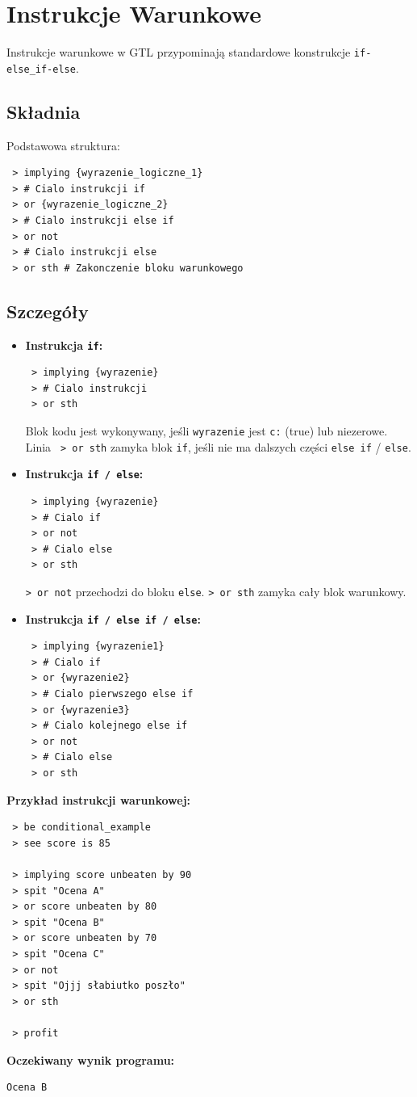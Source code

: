 \documentclass[12pt,a4paper]{article}
\begin{document}
\newpage
\section{Instrukcje Warunkowe}
\label{sec:conditionals}
Instrukcje warunkowe w GTL przypominają standardowe konstrukcje \texttt{if-else\_if-else}.

\subsection{Składnia}
Podstawowa struktura:
\begin{lstlisting}
 > implying {wyrazenie_logiczne_1}
 > # Cialo instrukcji if
 > or {wyrazenie_logiczne_2}
 > # Cialo instrukcji else if
 > or not
 > # Cialo instrukcji else
 > or sth # Zakonczenie bloku warunkowego
\end{lstlisting}

\subsection{Szczegóły}
\begin{itemize}
    \item \textbf{Instrukcja \texttt{if}:}
    \begin{lstlisting}
 > implying {wyrazenie}
 > # Cialo instrukcji
 > or sth
    \end{lstlisting}
    Blok kodu jest wykonywany, jeśli \texttt{{wyrazenie}} jest \texttt{c:} (true) lub niezerowe. Linia \texttt{ > or sth} zamyka blok \texttt{if}, jeśli nie ma dalszych części \texttt{else if} / \texttt{else}.

    \item \textbf{Instrukcja \texttt{if / else}:}
    \begin{lstlisting}
 > implying {wyrazenie}
 > # Cialo if
 > or not
 > # Cialo else
 > or sth
    \end{lstlisting}
    \texttt{> or not} przechodzi do bloku \texttt{else}. \texttt{> or sth} zamyka cały blok warunkowy.

    \item \textbf{Instrukcja \texttt{if / else if / else}:}
    \begin{lstlisting}
 > implying {wyrazenie1}
 > # Cialo if
 > or {wyrazenie2}
 > # Cialo pierwszego else if
 > or {wyrazenie3}
 > # Cialo kolejnego else if
 > or not
 > # Cialo else
 > or sth
    \end{lstlisting}
\end{itemize}

\textbf{Przykład instrukcji warunkowej:}
\begin{lstlisting}
 > be conditional_example
 > see score is 85

 > implying score unbeaten by 90
 > spit "Ocena A"
 > or score unbeaten by 80
 > spit "Ocena B"
 > or score unbeaten by 70
 > spit "Ocena C"
 > or not
 > spit "Ojjj słabiutko poszło"
 > or sth

 > profit
\end{lstlisting}
\textbf{Oczekiwany wynik programu:}
\begin{verbatim}
Ocena B
\end{verbatim}
\end{document}
